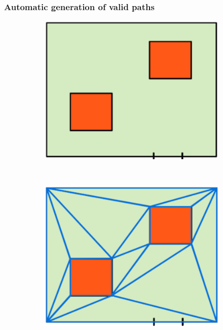 \documentclass[]{egpubl}
\begin{document}
\subsubsection*{Automatic generation of valid paths}

\begin{figure}[h]
 \centering
 \begin{subfigure}[b]{0.22\linewidth}
 \includegraphics[width=\textwidth]{images/graph-new-1}
 \caption{}
 \end{subfigure}
~
 \begin{subfigure}[b]{0.22\linewidth}
 \includegraphics[width=\textwidth]{images/graph-new-2}

\end{subfigure}
\end{figure}
\end{document}
